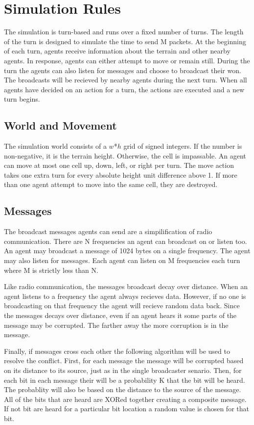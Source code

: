 \section{Simulation Rules}
\label{rules}

The simulation is turn-based and runs over a fixed number of turns. The length of the turn is designed to simulate the time to send M packets. At the beginning of each turn, agents receive information about the terrain and other nearby agents. In response, agents can either attempt to move or remain still. During the turn the agents can also listen for messages and choose to broadcast their won. The broadcasts will be recieved by nearby agents during the next turn. When all agents have decided on an action for a turn, the actions are executed and a new turn begins.

\subsection{World and Movement}

The simulation world consists of a $w$*$h$ grid of signed integers. If the number is non-negative, it is the terrain height. Otherwise, the cell is impassable. An agent can move at most one cell up, down, left, or right per turn. The move action takes one extra turn for every absolute height unit difference above 1. If more than one agent attempt to move into the same cell, they are destroyed.

\subsection{Messages}

The broadcast messages agents can send are a simpilification of radio communication. There are N frequencies an agent can broadcast on or listen too. An agent may broadcast a message of 1024 bytes on a single frequency. The agent may also listen for messages. Each agent can listen on M frequencies each turn where M is strictly less than N.

Like radio communication, the messages broadcast decay over distance. When an agent listens to a frequency the agent always recieves data. However, if no one is broadcasting on that frequency the agent will recieve random data back. Since the messages decays over distance, even if an agent hears it some parts of the message may be corrupted. The farther away the more corruption is in the message.

Finally, if messages cross each other the following algorithm will be used to resolve the conflict. First, for each message the message will be corrupted based on its distance to its source, just as in the single broadcaster senario. Then, for each bit in each message their will be a probability K that the bit will be heard. The probablity will also be based on the distance to the source of the message. All of the bits that are heard are XORed together creating a composite message. If not bit are heard for a particular bit location a random value is chosen for that bit.

